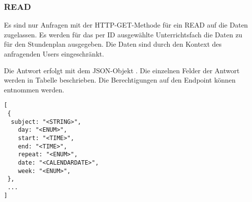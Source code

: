 \subsubsection{READ}
\label{secrest:api:subjects:id:timetable:read}
Es sind nur Anfragen mit der HTTP-GET-Methode für ein READ auf die Daten zugelassen.
Es werden für das per ID ausgewählte Unterrichtsfach die Daten zu für den Stundenplan ausgegeben.
Die Daten sind durch den Kontext des anfragenden Users eingeschränkt.

Die Antwort erfolgt mit dem JSON-Objekt . 
Die einzelnen Felder der Antwort werden in Tabelle  beschrieben.
Die Berechtigungen auf den Endpoint können  entnommen werden.

\begin{lstlisting}[caption={JSON-Antwort für einen GET-Aufruf der Route /api/subjects/\$id/timetable},label={lst:code:rest:api:subjects:id:timetable:read:ret},frame=tlrb]
[
 {
  subject: "<STRING>",
	day: "<ENUM>",
	start: "<TIME>",
	end: "<TIME>",
	repeat: "<ENUM>",
	date: "<CALENDARDATE>",
	week: "<ENUM>",
 },
 ...
]
\end{lstlisting}
